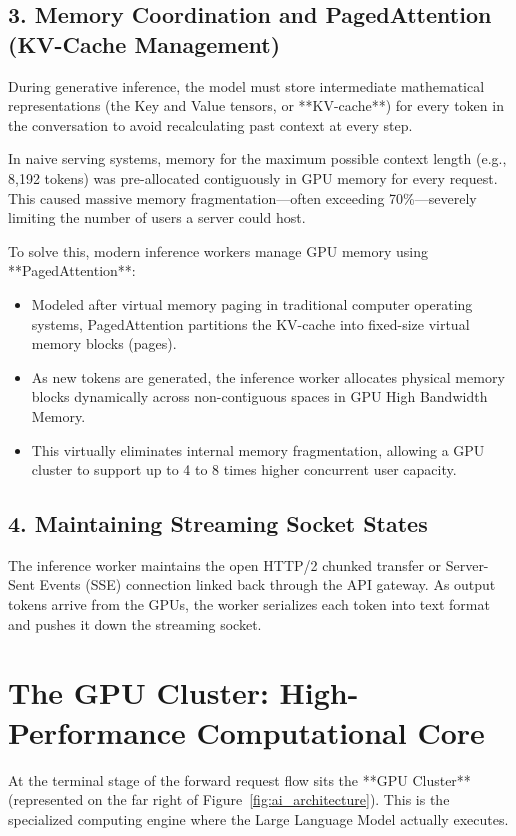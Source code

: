 \documentclass[12pt,a4paper]{report}
\begin{document}
\subsection{3. Memory Coordination and PagedAttention (KV-Cache Management)}
During generative inference, the model must store intermediate mathematical representations (the Key and Value tensors, or **KV-cache**) for every token in the conversation to avoid recalculating past context at every step.

In naive serving systems, memory for the maximum possible context length (e.g., 8,192 tokens) was pre-allocated contiguously in GPU memory for every request. This caused massive memory fragmentation—often exceeding 70\%—severely limiting the number of users a server could host.

To solve this, modern inference workers manage GPU memory using **PagedAttention**:
\begin{itemize}[leftmargin=1.2cm]
    \item Modeled after virtual memory paging in traditional computer operating systems, PagedAttention partitions the KV-cache into fixed-size virtual memory blocks (pages).
    \item As new tokens are generated, the inference worker allocates physical memory blocks dynamically across non-contiguous spaces in GPU High Bandwidth Memory.
    \item This virtually eliminates internal memory fragmentation, allowing a GPU cluster to support up to 4 to 8 times higher concurrent user capacity.
\end{itemize}

\subsection{4. Maintaining Streaming Socket States}
The inference worker maintains the open HTTP/2 chunked transfer or Server-Sent Events (SSE) connection linked back through the API gateway. As output tokens arrive from the GPUs, the worker serializes each token into text format and pushes it down the streaming socket.

\section{The GPU Cluster: High-Performance Computational Core}
At the terminal stage of the forward request flow sits the **GPU Cluster** (represented on the far right of Figure~\ref{fig:ai_architecture}). This is the specialized computing engine where the Large Language Model actually executes.
\end{document}

